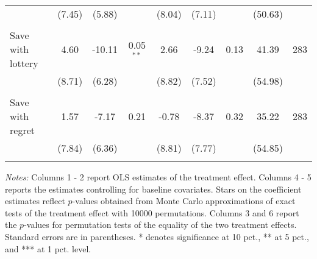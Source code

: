 \begin{table}[htbp]
{\begin{threeparttable}
\begin{tabular}{l*{8}{c}}
          &   (7.45)&   (5.88)&         &   (8.04)&   (7.11)&         &  (50.63)&         \\
          &         &         &         &         &         &         &         &         \\
Save with lottery&     4.60&   -10.11&0.05$^{**}$&     2.66&    -9.24&     0.13&    41.39&      283\\
          &   (8.71)&   (6.28)&         &   (8.82)&   (7.52)&         &  (54.98)&         \\
          &         &         &         &         &         &         &         &         \\
Save with regret&     1.57&    -7.17&     0.21&    -0.78&    -8.37&     0.32&    35.22&      283\\
          &   (7.84)&   (6.36)&         &   (8.81)&   (7.77)&         &  (54.85)&         \\
          &         &         &         &         &         &         &         &         \\
\bottomrule \end{tabular} \begin{tablenotes}[flushleft] \footnotesize \item \emph{Notes:} Columns 1 - 2 report OLS estimates of the treatment effect. Columns 4 - 5 reports the estimates controlling for baseline covariates. Stars on the coefficient estimates reflect \(p\)-values obtained from Monte Carlo approximations of exact tests of the treatment effect with 10000 permutations. Columns 3 and 6 report the \(p\)-values for permutation tests of the equality of the two treatment effects. Standard errors are in parentheses. * denotes significance at 10 pct., ** at 5 pct., and *** at 1 pct. level. \end{tablenotes} \end{threeparttable} } \end{table}

